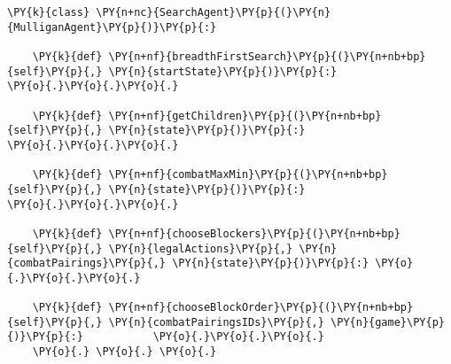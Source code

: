 \begin{Verbatim}[commandchars=\\\{\}]
\PY{k}{class} \PY{n+nc}{SearchAgent}\PY{p}{(}\PY{n}{MulliganAgent}\PY{p}{)}\PY{p}{:}

    \PY{k}{def} \PY{n+nf}{breadthFirstSearch}\PY{p}{(}\PY{n+nb+bp}{self}\PY{p}{,} \PY{n}{startState}\PY{p}{)}\PY{p}{:}                      \PY{o}{.}\PY{o}{.}\PY{o}{.}

    \PY{k}{def} \PY{n+nf}{getChildren}\PY{p}{(}\PY{n+nb+bp}{self}\PY{p}{,} \PY{n}{state}\PY{p}{)}\PY{p}{:}                                  \PY{o}{.}\PY{o}{.}\PY{o}{.}

    \PY{k}{def} \PY{n+nf}{combatMaxMin}\PY{p}{(}\PY{n+nb+bp}{self}\PY{p}{,} \PY{n}{state}\PY{p}{)}\PY{p}{:}                                 \PY{o}{.}\PY{o}{.}\PY{o}{.}

    \PY{k}{def} \PY{n+nf}{chooseBlockers}\PY{p}{(}\PY{n+nb+bp}{self}\PY{p}{,} \PY{n}{legalActions}\PY{p}{,} \PY{n}{combatPairings}\PY{p}{,} \PY{n}{state}\PY{p}{)}\PY{p}{:} \PY{o}{.}\PY{o}{.}\PY{o}{.}

    \PY{k}{def} \PY{n+nf}{chooseBlockOrder}\PY{p}{(}\PY{n+nb+bp}{self}\PY{p}{,} \PY{n}{combatPairingsIDs}\PY{p}{,} \PY{n}{game}\PY{p}{)}\PY{p}{:}           \PY{o}{.}\PY{o}{.}\PY{o}{.}
    \PY{o}{.} \PY{o}{.} \PY{o}{.}
\end{Verbatim}
